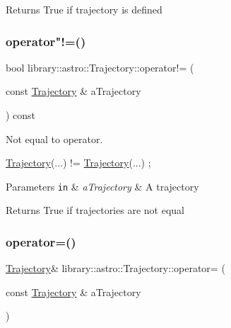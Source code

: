 \begin{DoxyReturn}{Returns}
True if trajectory is defined 
\end{DoxyReturn}
\mbox{\label{classlibrary_1_1astro_1_1_trajectory_a3fa102c5193028fabe84aa7cee9b3e55}} 
\subsubsection{\texorpdfstring{operator"!=()}{operator!=()}}
{\footnotesize\ttfamily bool library\+::astro\+::\+Trajectory\+::operator!= (\begin{DoxyParamCaption}\item[{const \hyperlink{classlibrary_1_1astro_1_1_trajectory}{Trajectory} \&}]{a\+Trajectory }\end{DoxyParamCaption}) const}



Not equal to operator. 


\begin{DoxyCode}
\hyperlink{classlibrary_1_1astro_1_1_trajectory_a8e5c7740915ca947e067c0f419ac1c65}{Trajectory}(...) != \hyperlink{classlibrary_1_1astro_1_1_trajectory_a8e5c7740915ca947e067c0f419ac1c65}{Trajectory}(...) ;
\end{DoxyCode}



\begin{DoxyParams}[1]{Parameters}
\mbox{\tt in}  & {\em a\+Trajectory} & A trajectory \\
\hline
\end{DoxyParams}
\begin{DoxyReturn}{Returns}
True if trajectories are not equal 
\end{DoxyReturn}
\mbox{\label{classlibrary_1_1astro_1_1_trajectory_abf8200a7b8e08ac9e0f26224fd26cd05}} 
\subsubsection{\texorpdfstring{operator=()}{operator=()}}
{\footnotesize\ttfamily \hyperlink{classlibrary_1_1astro_1_1_trajectory}{Trajectory}\& library\+::astro\+::\+Trajectory\+::operator= (\begin{DoxyParamCaption}\item[{const \hyperlink{classlibrary_1_1astro_1_1_trajectory}{Trajectory} \&}]{a\+Trajectory }\end{DoxyParamCaption})\hspace{0.3cm}{\ttfamily [delete]}}



